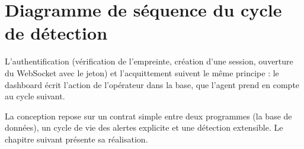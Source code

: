 \section{Diagramme de séquence du cycle de détection}



L'authentification (vérification de l'empreinte, création d'une session, ouverture du WebSocket avec le jeton) et l'acquittement suivent le même principe : le dashboard écrit l'action de l'opérateur dans la base, que l'agent prend en compte au cycle suivant.

\begin{conclusionchapitre}
La conception repose sur un contrat simple entre deux programmes (la base de données), un
cycle de vie des alertes explicite et une détection extensible. Le chapitre suivant présente sa
réalisation.
\end{conclusionchapitre}
